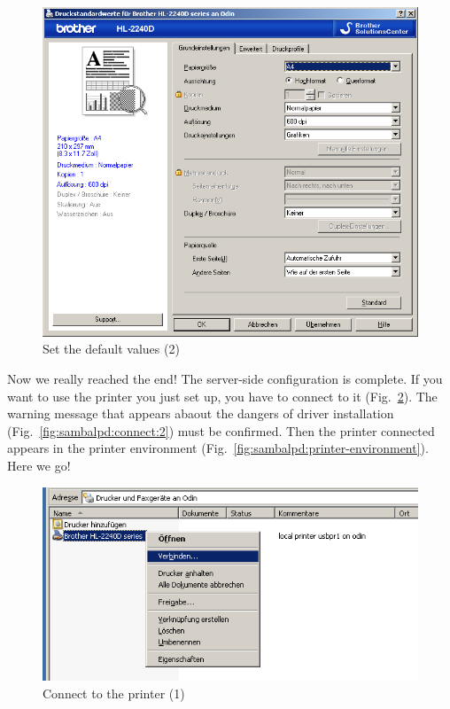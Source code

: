 \begin{figure}[hbt!]
\centering
\includegraphics[width=\columnwidth]{image019}
\caption{Set the default values (2)}
\label{fig:sambalpd:props-reloaded:2}
\end{figure}

Now we really reached the end! The server-side configuration is complete.
If you want to use the printer you just set up, you have to connect to it
(Fig.~\ref{fig:sambalpd:connect:1}). The warning message that appears abaout
the dangers of driver installation (Fig.~\ref{fig:sambalpd:connect:2}) must be
confirmed. Then the printer connected appears in the printer environment
(Fig.~\ref{fig:sambalpd:printer-environment}). Here we go!

\begin{figure}[hbt!]
\centering
\includegraphics[width=\columnwidth]{image020}
\caption{Connect to the printer (1)}
\label{fig:sambalpd:connect:1}
\end{figure}

